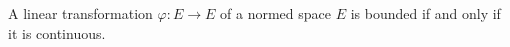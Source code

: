A linear transformation $\varphi: E \to E$ of a normed space $E$ is bounded if and only if it is continuous.

